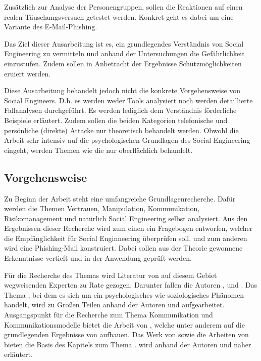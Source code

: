 Zusätzlich zur Analyse der Personengruppen, sollen die Reaktionen auf einen realen Täuschungsversuch getestet werden.
Konkret geht es dabei um eine Variante des E-Mail-Phishing.

Das Ziel dieser Ausarbeitung ist es, ein grundlegendes Verständnis von Social Engineering zu vermitteln
und anhand der Untersuchungen die Gefährlichkeit einzustufen. Zudem sollen in Anbetracht der Ergebnisse
Schutzmöglichkeiten eruiert werden.

Diese Ausarbeitung behandelt jedoch nicht die konkrete Vorgehensweise von Social Engineers.
D.h. es werden weder Tools analysiert noch werden detaillierte Fallanalysen durchgeführt.
Es werden lediglich dem Verständnis förderliche Beispiele erläutert.
Zudem sollen die beiden Kategorien telefonische und persönliche (direkte) Attacke nur theoretisch behandelt werden.
Obwohl die Arbeit sehr intensiv auf die psychologischen Grundlagen des Social Engineering eingeht, werden Themen wie die  nur oberflächlich behandelt.
 	

\subsection{Vorgehensweise}\label{sec:vorgehensweise}
Zu Beginn der Arbeit steht eine umfangreiche Grundlagenrecherche.
Dafür werden die Themen Vertrauen, Manipulation, Kommunikation, Risikomanagement und natürlich Social Engineering selbst analysiert.
Aus den Ergebnissen dieser Recherche wird zum einen ein Fragebogen entworfen, welcher die Empfänglichkeit für Social Enginneering überprüfen soll, und zum anderen wird eine Phishing-Mail konstruiert.
Dabei sollen aus der Theorie gewonnene Erkenntnisse vertieft und in der Anwendung geprüft werden.

Für die Recherche des Themas  wird Literatur von auf diesem Gebiet wegweisenden Experten zu Rate gezogen. Darunter fallen die Autoren ,  und .
Das Thema , bei dem es sich um ein psychologisches wie soziologisches Phänomen handelt, wird zu Großen Teilen anhand der Autoren  und  aufgearbeitet.
Ausgangspunkt für die Recherche zum Thema Kommunikation und Kommunikationsmodelle bietet die Arbeit  von , welche unter anderem auf die grundlegenden Ergebnisse von  aufbauen.
Das Werk  von  sowie die Arbeiten von  bieten die Basis des Kapitels zum Thema .
 wird anhand der Autoren  und  näher erläutert.

